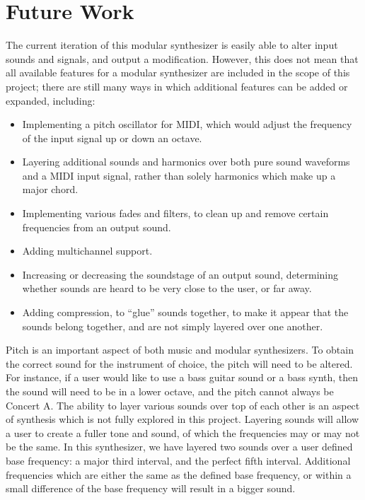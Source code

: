 \section{Future Work}

The current iteration of this modular synthesizer is easily able to alter input sounds and signals, and output a modification. However, this does not mean that all available features for a modular synthesizer are included in the scope of this project; there are still many ways in which additional features can be added or expanded, including:

\begin{itemize}
	\item Implementing a pitch oscillator for MIDI, which would adjust the frequency of the input signal up or down an octave.
	\item Layering additional sounds and harmonics over both pure sound waveforms and a MIDI input signal, rather than solely harmonics which make up a major chord.
	\item Implementing various fades and filters, to clean up and remove certain frequencies from an output sound.
	\item Adding multichannel support. 
	\item Increasing or decreasing the soundstage of an output sound, determining whether sounds are heard to be very close to the user, or far away.
	\item Adding compression, to ``glue'' sounds together, to make it appear that the sounds belong together, and are not simply layered over one another.
\end{itemize}

Pitch is an important aspect of both music and modular synthesizers. To obtain the correct sound for the instrument of choice, the pitch will need to be altered. For instance, if a user would like to use a bass guitar sound or a bass synth, then the sound will need to be in a lower octave, and the pitch cannot always be Concert A. The ability to layer various sounds over top of each other is an aspect of synthesis which is not fully explored in this project. Layering sounds will allow a user to create a fuller tone and sound, of which the frequencies may or may not be the same. In this synthesizer, we have layered two sounds over a user defined base frequency: a major third interval, and the perfect fifth interval. Additional frequencies which are either the same as the defined base frequency, or within a small difference of the base frequency will result in a bigger sound.

